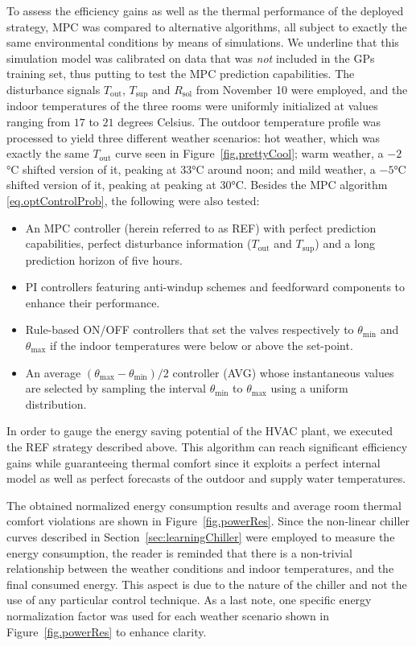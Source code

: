 To assess the efficiency gains as well as the thermal performance of the deployed strategy, MPC was compared to alternative algorithms, all subject to exactly the same environmental conditions by means of simulations. We underline that this simulation model was calibrated on data that was \textit{not} included in the GPs training set, thus putting to test the MPC prediction capabilities. The disturbance signals $T_\text{out}$, $T_\text{sup}$ and $R_\text{sol}$ from November 10 were employed, and the indoor temperatures of the three rooms were uniformly initialized at values ranging from $17$ to $21$ degrees Celsius. The outdoor temperature profile was processed to yield three different weather scenarios: hot weather, which was exactly the same $T_\text{out}$ curve seen in Figure~\ref{fig.prettyCool}; warm weather, a $-2$°C shifted version of it, peaking at 33°C around noon; and mild weather, a $-5$°C shifted version of it, peaking at peaking at 30°C. Besides the MPC algorithm \eqref{eq.optControlProb}, the following were also tested:
\begin{itemize}
	\item An MPC controller (herein referred to as REF) with perfect prediction capabilities, perfect disturbance information ($T_\text{out}$ and $T_\text{sup}$) and a long prediction horizon of five hours.
	\item PI controllers featuring anti-windup schemes and feedforward components to enhance their performance.
	\item Rule-based ON/OFF controllers that set the valves respectively to $\theta_\text{min}$ and $\theta_\text{max}$ if the indoor temperatures were below or above the set-point. 
	\item An average $(\theta_\text{max}-\theta_\text{min})/2$ controller (AVG) whose instantaneous values are selected by sampling the interval $\theta_\text{min}$ to $\theta_\text{max}$ using a uniform distribution.
\end{itemize}

In order to gauge the energy saving potential of the HVAC plant, we executed the REF strategy described above. This algorithm can reach significant efficiency gains while guaranteeing thermal comfort since it exploits a perfect internal model as well as perfect forecasts of the outdoor and supply water temperatures.

The obtained normalized energy consumption results and average room thermal comfort violations are shown in Figure~\ref{fig.powerRes}. Since the non-linear chiller curves described in Section~\ref{sec:learningChiller} were employed to measure the energy consumption, the reader is reminded that there is a non-trivial relationship between the weather conditions and indoor temperatures, and the final consumed energy. This aspect is due to the nature of the chiller and not the use of any particular control technique. As a last note, one specific energy normalization factor was used for each weather scenario shown in Figure~\ref{fig.powerRes} to enhance clarity.

